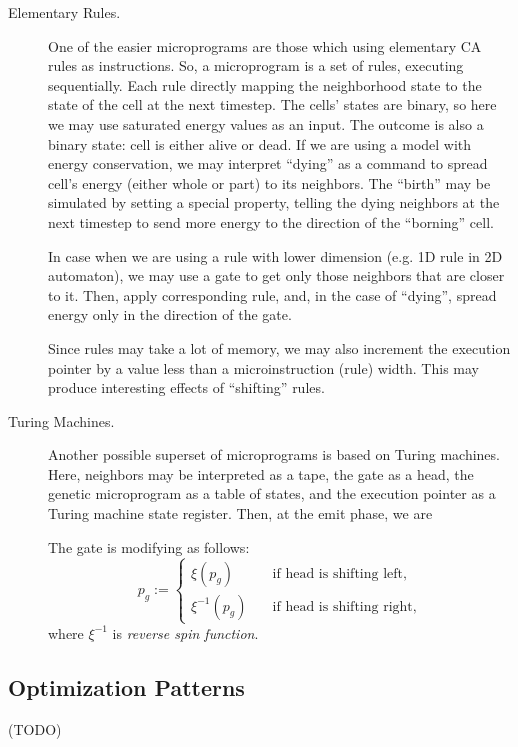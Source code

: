 \documentclass[a4paper,12pt,tikz,UTF8]{article}
\begin{document}
\begin{description}
      \item [Elementary Rules.] One of the easier microprograms are those which using elementary CA rules as instructions. So, a microprogram is a set of rules, executing sequentially. Each rule directly mapping the neighborhood state to the state of the cell at the next timestep. The cells' states are binary, so here we may use saturated energy values as an input. The outcome is also a binary state: cell is either alive or dead. If we are using a model with energy conservation, we may interpret ``dying'' as a command to spread cell's energy (either whole or part) to its neighbors. The ``birth'' may be simulated by setting a special property, telling the dying neighbors at the next timestep to send more energy to the direction of the ``borning'' cell.

        In case when we are using a rule with lower dimension (e.g. 1D rule in 2D automaton), we may use a gate to get only those neighbors that are closer to it. Then, apply corresponding rule, and, in the case of ``dying'', spread energy only in the direction of the gate.

        Since rules may take a lot of memory, we may also increment the execution pointer by a value less than a microinstruction (rule) width. This may produce interesting effects of ``shifting'' rules.

      \item [Turing Machines.] Another possible superset of microprograms is based on Turing machines. Here, neighbors may be interpreted as a tape, the gate as a head, the genetic microprogram as a table of states, and the execution pointer as a Turing machine state register. Then, at the emit phase, we are 

        The gate is modifying as follows:
        \begin{equation}
          p_g := 
          \begin{cases}
            \xi(p_g) \quad & \text{if head is shifting left},\\
            \xi^{-1}(p_g) \quad & \text{if head is shifting right},
          \end{cases}
        \end{equation}
        where $\xi^{-1}$ is \textit{reverse spin function}.

    \end{description}

  \subsection{Optimization Patterns}

    (TODO)
\end{document}
